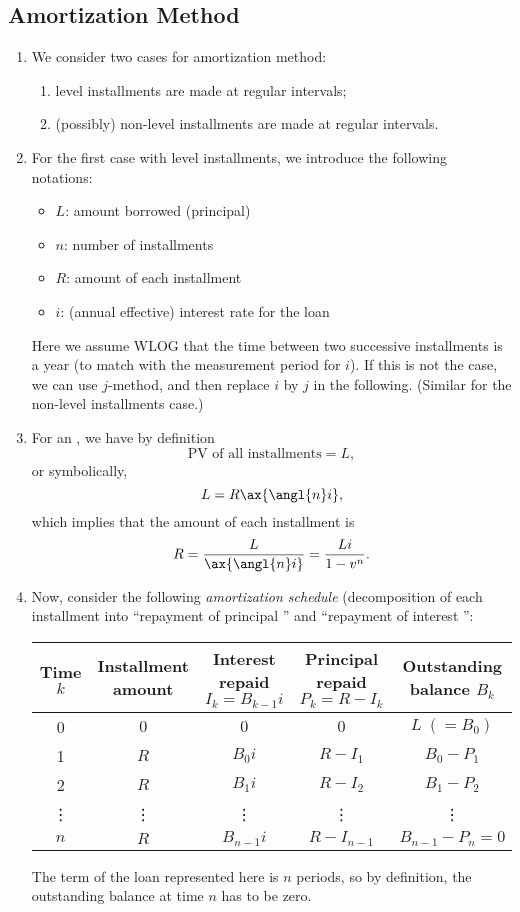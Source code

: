 \subsection{Amortization Method} \begin{enumerate}
\item We consider two cases for amortization method:
\begin{enumerate}
\item level installments are made at regular intervals;
\item (possibly) non-level installments are made at regular intervals.
\end{enumerate}
\item \label{it:level-amort-notations}
For the first case with level installments, we introduce the following
notations:
\begin{itemize}
\item \(L\): amount borrowed (principal)
\item \(n\): number of installments
\item \(R\): amount of each installment
\item \(i\): (annual effective) interest rate for the loan
\end{itemize}
Here we assume WLOG that the time between two successive installments is a year
(to match with the measurement period for \(i\)). If this is not the case, we
can use \(j\)-method, and then replace \(i\) by \(j\) in the following.
(Similar for the non-level installments case.)
\item \label{it:amort-loan-def}
For an , we have by definition
\[
\text{PV of all installments}=L,
\]
or symbolically,
\[
L=R\ax{\angl{n}i},
\]
which implies that the amount of each installment is
\[
R=\frac{L}{\ax{\angl{n}i}}=\frac{Li}{1-v^n}.
\]
\item \label{it:amort-schedule}
Now, consider the following \emph{amortization schedule} (decomposition
of each installment into ``repayment of principal '' and
``repayment of interest '':
\begin{center}
\begin{tabular}{ccccc}
\toprule
Time \(k\)&Installment amount&
\makecell{Interest repaid\\ \(I_k=B_{k-1}i\)}&
\makecell{Principal repaid \\ \(P_k=R-I_k\)}&Outstanding balance \(B_k\) \\
\midrule
0&\(0\)&\(0\)&\(0\)&\(L\;(=B_0)\) \\
1&\(R\)&\(B_0i\)&\(R-I_1\)&\(B_0-P_1\) \\
2&\(R\)&\(B_1i\)&\(R-I_2\)&\(B_1-P_2\) \\
\vdots&\vdots&\vdots&\vdots&\vdots\\
\(n\)&\(R\)&\(B_{n-1}i\)&\(R-I_{n-1}\)&\(B_{n-1}-P_n=0\)\\
\bottomrule
\end{tabular}
\end{center}
\begin{note}
The term of the loan represented here is \(n\) periods, so by definition, the
outstanding balance at time \(n\) has to be zero.
\end{note}


\end{enumerate}
